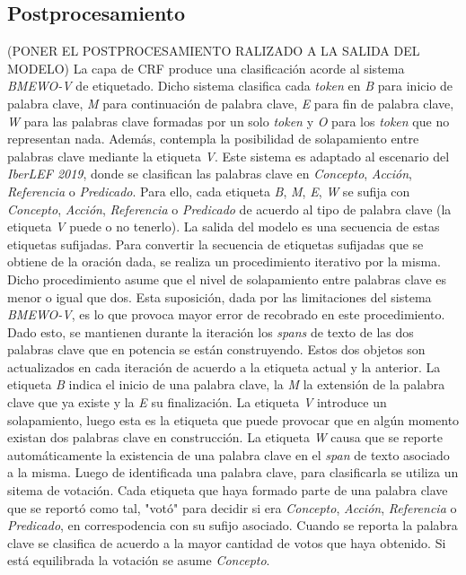\subsection{Postprocesamiento}
(PONER EL POSTPROCESAMIENTO RALIZADO A LA SALIDA DEL MODELO)
La capa de CRF produce una clasificaci\'on acorde al sistema \emph{BMEWO-V} de etiquetado. Dicho sistema clasifica cada \emph{token} en \emph{B} para inicio de palabra clave, \emph{M} para continuaci\'on de palabra clave, \emph{E} para fin de palabra clave, \emph{W} para las palabras clave formadas por un solo \emph{token} y \emph{O} para los \emph{token} que no representan nada. Adem\'as, contempla la posibilidad de solapamiento entre palabras clave mediante la etiqueta \emph{V}. 
\newline
\newline
Este sistema es adaptado al escenario del \emph{IberLEF 2019}, donde se clasifican las palabras clave en \emph{Concepto}, \emph{Acci\'on}, \emph{Referencia} o \emph{Predicado}. Para ello, cada etiqueta \emph{B}, \emph{M}, \emph{E}, \emph{W} se sufija con \emph{Concepto}, \emph{Acci\'on}, \emph{Referencia} o \emph{Predicado} de acuerdo al tipo de palabra clave (la etiqueta \emph{V} puede o no tenerlo). La salida del modelo es una secuencia de estas etiquetas sufijadas. 
\newline
\newline
Para convertir la secuencia de etiquetas sufijadas que se obtiene de la oraci\'on dada, se realiza un procedimiento iterativo por la misma. Dicho procedimiento asume que el nivel de solapamiento entre palabras clave es menor o igual que dos. Esta suposici\'on, dada por las limitaciones del sistema \emph{BMEWO-V}, es lo que provoca mayor error de recobrado en este procedimiento. Dado esto, se mantienen durante la iteraci\'on los \emph{spans} de texto de las dos palabras clave que en potencia se est\'an construyendo. Estos dos objetos son actualizados en cada iteraci\'on de acuerdo a la etiqueta actual y la anterior. La etiqueta \emph{B} indica el inicio de una palabra clave, la \emph{M} la extensi\'on de la palabra clave que ya existe y la \emph{E} su finalizaci\'on. La etiqueta \emph{V} introduce un solapamiento, luego esta es la etiqueta que puede provocar que en alg\'un momento existan dos palabras clave en construcci\'on. La etiqueta \emph{W} causa que se reporte autom\'aticamente la existencia de una palabra clave en el \emph{span} de texto asociado a la misma. Luego de identificada una palabra clave, para clasificarla se utiliza un sitema de votaci\'on. Cada etiqueta que haya formado parte de una palabra clave que se report\'o como tal, "vot\'o" para decidir si era \emph{Concepto}, \emph{Acci\'on}, \emph{Referencia} o \emph{Predicado}, en correspodencia con su sufijo asociado. Cuando se reporta la palabra clave se clasifica de acuerdo a la mayor cantidad de votos que haya obtenido. Si est\'a equilibrada la votaci\'on se asume \emph{Concepto}.



















